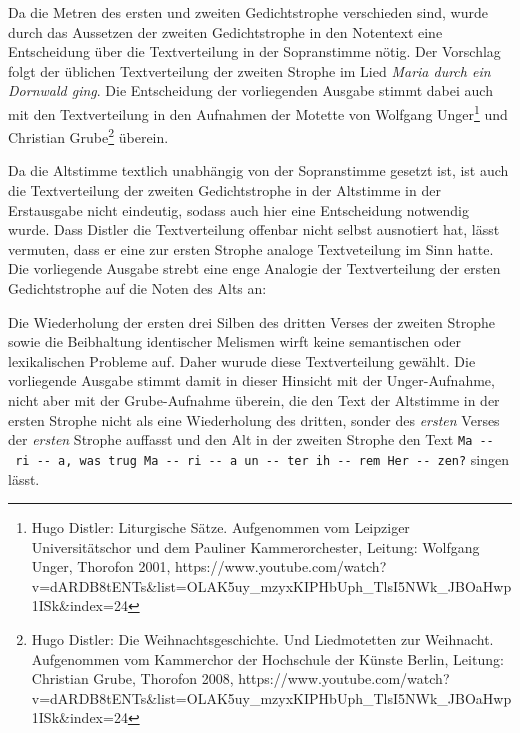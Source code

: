 \documentclass{article}
\begin{document}
\begin{multicols}{2}
Da die Metren des ersten und zweiten Gedichtstrophe verschieden sind,
wurde durch das Aussetzen der zweiten Gedichtstrophe in den Notentext
eine Entscheidung über die Textverteilung in der Sopranstimme nötig. Der
Vorschlag folgt der üblichen Textverteilung der zweiten Strophe im Lied
\emph{Maria durch ein Dornwald ging}. Die Entscheidung der vorliegenden
Ausgabe stimmt dabei auch mit den Textverteilung in den Aufnahmen der
Motette von Wolfgang Unger\footnote{Hugo Distler: Liturgische Sätze.
  Aufgenommen vom Leipziger Universitätschor und dem Pauliner
  Kammerorchester, Leitung: Wolfgang Unger, Thorofon 2001,
  https://www.youtube.com/watch?v=dARDB8tENTs\&list=OLAK5uy\_mzyxKIPHbUph\_TlsI5NWk\_JBOaHwp1ISk\&index=24}
und Christian Grube\footnote{Hugo Distler: Die Weihnachtsgeschichte. Und
  Liedmotetten zur Weihnacht. Aufgenommen vom Kammerchor der Hochschule
  der Künste Berlin, Leitung: Christian Grube, Thorofon 2008,
  https://www.youtube.com/watch?v=dARDB8tENTs\&list=OLAK5uy\_mzyxKIPHbUph\_TlsI5NWk\_JBOaHwp1ISk\&index=24}
überein.

Da die Altstimme textlich unabhängig von der Sopranstimme gesetzt ist,
ist auch die Textverteilung der zweiten Gedichtstrophe in der Altstimme
in der Erstausgabe nicht eindeutig, sodass auch hier eine Entscheidung
notwendig wurde. Dass Distler die Textverteilung offenbar nicht selbst
ausnotiert hat, lässt vermuten, dass er eine zur ersten Strophe analoge
Textveteilung im Sinn hatte. Die vorliegende Ausgabe strebt eine enge
Analogie der Textverteilung der ersten Gedichtstrophe auf die Noten des
Alts an:

Die Wiederholung der ersten drei Silben des dritten Verses der zweiten
Strophe sowie die Beibhaltung identischer Melismen wirft keine
semantischen oder lexikalischen Probleme auf. Daher wurude diese
Textverteilung gewählt. Die vorliegende Ausgabe stimmt damit in dieser
Hinsicht mit der Unger-Aufnahme, nicht aber mit der Grube-Aufnahme
überein, die den Text der Altstimme in der ersten Strophe nicht als eine
Wiederholung des dritten, sonder des \emph{ersten} Verses der
\emph{ersten} Strophe auffasst und den Alt in der zweiten Strophe den
Text
\texttt{Ma\ -\/-\ ri\ -\/-\ a,\ was\ trug\ Ma\ -\/-\ ri\ -\/-\ a\ un\ -\/-\ ter\ ih\ -\/-\ rem\ Her\ -\/-\ zen?}
singen lässt.


\end{multicols}
\end{document}
